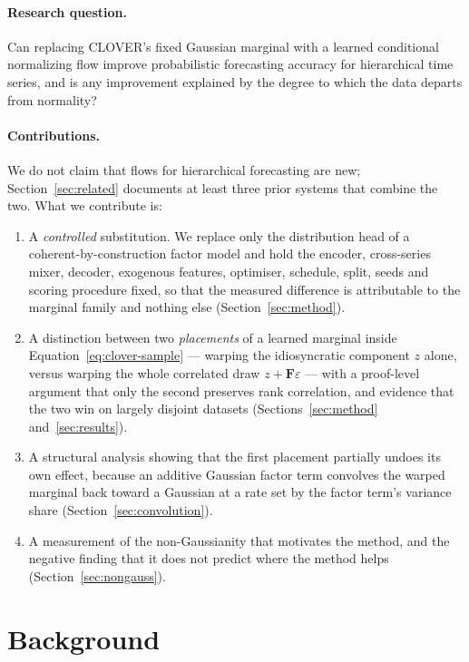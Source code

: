 \documentclass[11pt]{article}
\newcommand{\Fmat}{\mathbf{F}}
\begin{document}
\paragraph{Research question.} Can replacing CLOVER's fixed Gaussian marginal with
a learned conditional normalizing flow improve probabilistic forecasting accuracy
for hierarchical time series, and is any improvement explained by the degree to
which the data departs from normality?

\paragraph{Contributions.} We do not claim that flows for hierarchical forecasting
are new; Section~\ref{sec:related} documents at least three prior systems that
combine the two. What we contribute is:
\begin{enumerate}
\item A \emph{controlled} substitution. We replace only the distribution head of a
coherent-by-construction factor model and hold the encoder, cross-series mixer,
decoder, exogenous features, optimiser, schedule, split, seeds and scoring
procedure fixed, so that the measured difference is attributable to the marginal
family and nothing else (Section~\ref{sec:method}).
\item A distinction between two \emph{placements} of a learned marginal inside
Equation~\eqref{eq:clover-sample} --- warping the idiosyncratic component $z$
alone, versus warping the whole correlated draw $z + \Fmat\varepsilon$ --- with a
proof-level argument that only the second preserves rank correlation, and evidence
that the two win on largely disjoint datasets (Sections~\ref{sec:method}
and~\ref{sec:results}).
\item A structural analysis showing that the first placement partially undoes its
own effect, because an additive Gaussian factor term convolves the warped marginal
back toward a Gaussian at a rate set by the factor term's variance share
(Section~\ref{sec:convolution}).
\item A measurement of the non-Gaussianity that motivates the method, and the
negative finding that it does not predict where the method helps
(Section~\ref{sec:nongauss}).
\end{enumerate}

\section{Background}
\end{document}
